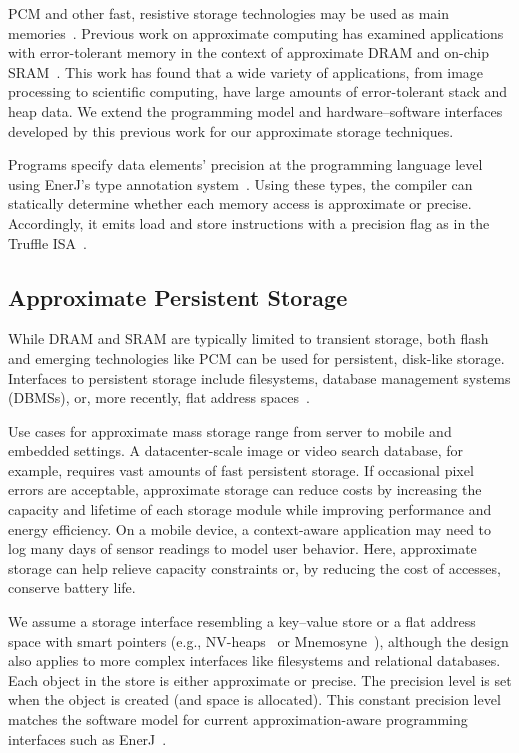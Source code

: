 PCM and other fast, resistive storage technologies may be used 
as main memories~\cite{pcm-dram-alt,durable-pcm-mm,qureshi-pcm-mm}.
Previous work on approximate computing has examined applications with
error-tolerant memory in the context of approximate DRAM and
on-chip SRAM~\cite{flikker,enerj,truffle}. This work has found that
a wide variety of applications, from image processing to scientific
computing, have large amounts of error-tolerant stack and heap data.
We extend the programming model and hardware--software interfaces
developed by this previous work for our approximate storage
techniques.

Programs specify data elements' precision at the programming language level using EnerJ's
type annotation system~\cite{enerj}.
Using these types, the compiler
can statically determine whether each memory access is approximate or
precise. Accordingly, it emits load and store instructions with a
precision flag as in the Truffle ISA~\cite{truffle}.

\subsection{Approximate Persistent Storage}

While DRAM and SRAM are typically limited to transient storage,
both flash and emerging technologies like PCM can be used for
persistent, disk-like storage. 
Interfaces to persistent storage include
filesystems, database management systems (DBMSs),
or, more recently, flat address spaces~\cite{nvheaps,mnemosyne}.

Use cases
for approximate mass storage range from server to mobile and embedded
settings. A datacenter-scale image or video search database, for example,
requires vast amounts of fast persistent storage. If occasional
pixel errors are acceptable, approximate storage can reduce costs by
increasing the capacity and lifetime of each storage module while improving
performance and energy efficiency. On a mobile device, a
context-aware application may need to log many days of sensor readings to
model user behavior. Here, approximate storage can help relieve capacity
constraints or, by reducing the cost of accesses,
conserve battery life.

We assume a storage interface resembling a key--value store or a flat address
space with smart pointers (e.g., NV-heaps~\cite{nvheaps} or
Mnemosyne~\cite{mnemosyne}), although the design also applies to more
complex interfaces like filesystems and relational databases. Each
object in the store is either approximate or precise. The precision level is
set when the object is created (and space is allocated).
This constant precision level matches the software model for current
approximation-aware programming interfaces such as EnerJ~\cite{enerj}.


